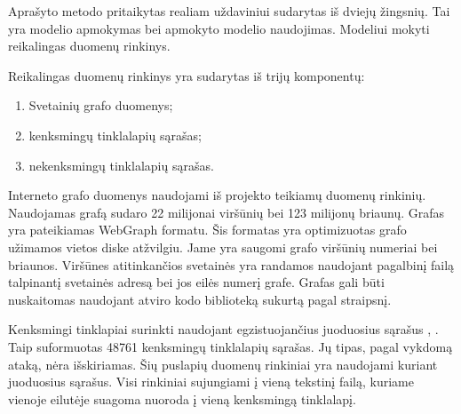 Aprašyto metodo pritaikytas realiam uždaviniui sudarytas iš dviejų žingsnių. Tai yra modelio apmokymas bei apmokyto modelio naudojimas. Modeliui mokyti reikalingas duomenų rinkinys.


Reikalingas duomenų rinkinys yra sudarytas iš trijų komponentų:
\begin{enumerate}
    \item Svetainių grafo duomenys;
    \item kenksmingų tinklalapių sąrašas;
    \item nekenksmingų tinklalapių sąrašas.
\end{enumerate}

Interneto grafo duomenys naudojami iš \cite{webgraph} projekto teikiamų duomenų rinkinių. Naudojamas grafą sudaro 22 milijonai viršūnių bei 123 milijonų briaunų. Grafas yra pateikiamas WebGraph formatu. Šis formatas yra optimizuotas grafo užimamos vietos diske atžvilgiu. Jame yra saugomi grafo viršūnių numeriai bei briaunos. Viršūnes atitinkančios svetainės yra randamos naudojant pagalbinį failą talpinantį svetainės adresą bei jos eilės numerį grafe. Grafas gali būti nuskaitomas naudojant atviro kodo biblioteką sukurtą pagal \cite{boldi2004webgraph} straipsnį.

Kenksmingi tinklapiai surinkti naudojant egzistuojančius juoduosius sąrašus \cite{mal1}, \cite{mal2} \cite{mal3} \cite{mal4}. Taip suformuotas 48761 kenksmingų tinklalapių sąrašas. Jų tipas, pagal vykdomą ataką, nėra išskiriamas. Šių puslapių duomenų rinkiniai yra naudojami kuriant juoduosius sąrašus. Visi rinkiniai sujungiami į vieną tekstinį failą, kuriame vienoje eilutėje suagoma nuoroda į vieną kenksmingą tinklalapį.


